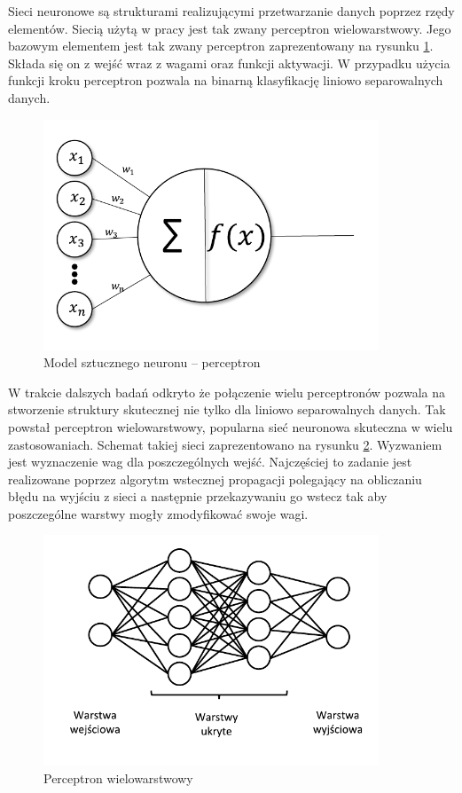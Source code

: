 \documentclass[inzynierska]{pwr_wmat_praca_dyplomowa}
\theoremstyle{plain}
\numberwithin{theorem}{chapter}
\theoremstyle{definition}
\numberwithin{theorem}{chapter}
\begin{document}
Sieci neuronowe są strukturami realizującymi przetwarzanie danych poprzez rzędy elementów. Siecią użytą w pracy jest tak zwany perceptron wielowarstwowy. Jego bazowym elementem jest tak zwany perceptron zaprezentowany na rysunku \ref{perceptron}. Składa się on z wejść wraz z wagami oraz funkcji aktywacji. W przypadku użycia funkcji kroku perceptron pozwala na binarną klasyfikację liniowo separowalnych danych. 
\begin{figure}[ht]
	\centering
	\includegraphics[width=10cm]{images/perceptron_c.pdf}
	\caption{Model sztucznego neuronu -- perceptron}
	\label{perceptron}
\end{figure}
W trakcie dalszych badań odkryto że połączenie wielu perceptronów pozwala na stworzenie struktury skutecznej nie tylko dla liniowo separowalnych danych. Tak powstał perceptron wielowarstwowy, popularna sieć neuronowa skuteczna w wielu zastosowaniach. Schemat takiej sieci zaprezentowano na rysunku \ref{mlp}. Wyzwaniem jest wyznaczenie wag dla poszczególnych wejść. Najczęściej to zadanie jest realizowane poprzez algorytm wstecznej propagacji polegający na obliczaniu błędu na wyjściu z sieci a następnie przekazywaniu go wstecz tak aby poszczególne warstwy mogły zmodyfikować swoje wagi. 
\begin{figure}[ht]
	\centering
	\includegraphics[width=10cm]{images/siec_c.pdf}
	\caption{Perceptron wielowarstwowy}
	\label{mlp}
\end{figure}
\end{document}
